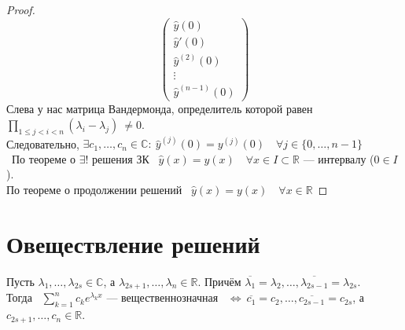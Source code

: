 \documentclass[11pt]{article}
\begin{document}
\begin{proof}
\[\begin{pmatrix}
    \widehat{y}(0) \\
    \widehat{y}'(0) \\
    \widehat{y}^{(2)}(0) \\
    \vdots \\
    \widehat{y}^{(n - 1)}(0)
  \end{pmatrix}
  \]
  Слева у нас матрица Вандермонда, определитель которой равен $\displaystyle \prod_{1 \leq j < i < n} (\lambda_i - \lambda_j) \ \neq 0$. \\
  Следовательно, $\exists c_1, \ldots, c_n \in \mathbb{C}: \ \widehat{y}^{(j)}(0) = y^{(j)}(0) \quad \forall j \in \{0, \ldots, n - 1\}$ \\\
  По теореме о $\exists !$ решения ЗК \ $\widehat{y}(x) = y(x) \quad \forall x \in I \subset \mathbb{R}$ --- интервалу ($0 \in I$). \\
  По теореме о продолжении решений \ $\widehat{y}(x) = y(x) \quad \forall x \in \mathbb{R}$
\end{proof}

\section{Овеществление решений}

\begin{lemma}
  Пусть $\lambda_1, \ldots, \lambda_{2s} \in \mathbb{C}$, а $\lambda_{2s + 1}, \ldots, \lambda_n \in \mathbb{R}$. Причём $\overline{\lambda_1} = \lambda_2, \ldots, \overline{\lambda_{2s - 1}} = \lambda_{2s}$. \\
  Тогда \ $\displaystyle \sum_{k = 1}^n c_k e^{\lambda_k x}$ --- вещественнозначная \ $\Longleftrightarrow \ \overline{c_1} = c_2, \ldots, \overline{c_{2s - 1}} = c_{2s}$, а $c_{2s + 1}, \ldots, c_n \in \mathbb{R}$.
\end{lemma}
\end{document}
